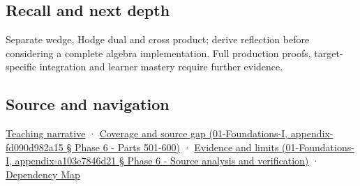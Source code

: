 \subsection{Recall and next depth}\label{recall-and-next-depth}

Separate wedge, Hodge dual and cross product; derive reflection before considering a complete algebra implementation. Full production proofs, target-specific integration and learner mastery require further evidence.

\subsection{Source and navigation}\label{source-and-navigation}

\href{Continuous\%20Notes/Computing\%20Foundations\%20-\%20From\%20Bits\%20to\%20C++\%20and\%20Systems\%20APIs\#Oriented\%20areas\%20deserve\%20their\%20own\%20representation}{Teaching narrative} · \href{}{Coverage and source gap (01-Foundations-I, appendix-fd090d982a15 § Phase 6 - Parts 501-600)} · \href{}{Evidence and limits (01-Foundations-I, appendix-a103e7846d21 § Phase 6 - Source analysis and verification)} · \hyperref[appendix-4ad47bdd269a]{Dependency Map}
